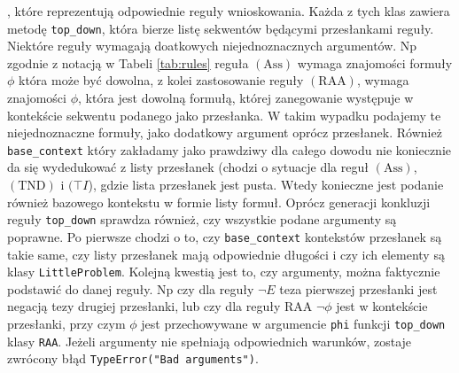 \documentclass{article}
\begin{document}
, które reprezentują odpowiednie reguły wnioskowania. Każda z tych klas zawiera metodę \texttt{top\_down}, która bierze listę sekwentów będącymi przesłankami reguły. Niektóre reguły wymagają doatkowych niejednoznacznych argumentów. Np zgodnie z notacją w Tabeli \ref{tab:rules} reguła $\mathrm{(Ass)}$ wymaga znajomości formuły $\phi$ która może być dowolna, z kolei zastosowanie reguły $\mathrm{(RAA)}$, wymaga znajomości $\phi$, która jest dowolną formułą, której zanegowanie występuje w kontekście sekwentu podanego jako przesłanka. W takim wypadku podajemy te niejednoznaczne formuły, jako dodatkowy argument oprócz przesłanek. Również \texttt{base\_context} który zakładamy jako prawdziwy dla całego dowodu nie koniecznie da się wydedukować z listy przesłanek (chodzi o sytuacje dla reguł $\mathrm{(Ass)}$, $\mathrm{(TND)}$ i $(\top I$), gdzie lista przesłanek jest pusta. Wtedy konieczne jest podanie również bazowego kontekstu w formie listy formuł. Oprócz generacji konkluzji reguły \texttt{top\_down} sprawdza również, czy wszystkie podane argumenty są poprawne. Po pierwsze chodzi o to, czy \texttt{base\_context} kontekstów przesłanek są takie same, czy listy przesłanek mają odpowiednie długości i czy ich elementy są klasy \texttt{LittleProblem}. Kolejną kwestią jest to, czy argumenty, można faktycznie podstawić do danej reguły. Np czy dla reguły $\neg E$ teza pierwszej przesłanki jest negacją tezy drugiej przesłanki, lub  czy dla reguły $\mathrm{RAA}$ $\neg \phi$  jest w kontekście przesłanki, przy czym $\phi$ jest przechowywane w argumencie \texttt{phi} funkcji \texttt{top\_down} klasy \texttt{RAA}. Jeżeli argumenty nie spełniają odpowiednich warunków, zostaje zwrócony błąd \texttt{TypeError("Bad arguments")}.
\end{document}
